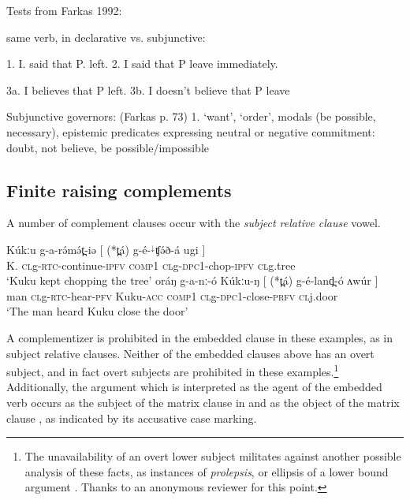 Tests from Farkas 1992:

same verb, in declarative vs. subjunctive:

1. I. said that P. left.
2. I said that P leave immediately.

3a. I believes that P left.
3b. I doesn't believe that P leave

Subjunctive governors: (Farkas p. 73)
1. `want', `order', modals (be possible, necessary), epistemic predicates expressing neutral or negative commitment: doubt, not believe, be possible/impossible



\subsection{Finite raising complements}\label{sec:ch15:dpc1}

A number of complement clauses occur with the \textit{subject relative clause} vowel.

\ea  \gll  Kúkːu	g-a-rə́mə́t̪-iə      $[$    (*t̪á)     g-{é}-$^{↓}$ʧə́ð-á                   ugi  $]$	\\
K. \textsc{cl}g-\textsc{rtc}-continue-\textsc{ipfv}  {}  \textsc{comp1} \textsc{cl}g-\textsc{dpc1}-chop-\textsc{ipfv}  \textsc{cl}g.tree {} {}\\
\glt ‘Kuku kept chopping the tree’\label{ex:ch15:tree3}
\ex \gll 	oráŋ   g-a-nː-ó 	            Kúkːu-ŋ     $[$ (*t̪á)   g-{é}-land̪-ó                     ʌwúr  $]$\\
	man    \textsc{cl}g-\textsc{rtc}-hear-\textsc{pfv}  Kuku-\textsc{acc} {} \textsc{comp1}   \textsc{cl}g-\textsc{dpc1}-close-\textsc{prfv}     \textsc{cl}j.door {}\\
\glt‘The man heard Kuku close the door’ \label{ex:ch15:door3}
\z 


A complementizer is prohibited in the embedded clause in these examples, as in subject relative clauses. Neither of the embedded clauses above has an overt subject, and in fact overt subjects are prohibited in these examples.\footnote{The unavailability of an overt lower subject militates against another possible analysis of these facts, as instances of \textit{prolepsis}, or ellipsis of a lower bound argument \citep{davies05}. Thanks to an anonymous reviewer for this point.} Additionally, the argument which is interpreted as the agent of the embedded verb occurs as the subject of the matrix clause in  and as the object of the matrix clause , as indicated by its accusative case marking.

